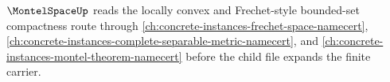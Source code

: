 $\MontelSpaceUp$ reads the locally convex and Frechet-style bounded-set compactness route through \autoref{ch:concrete-instances-frechet-space-namecert}, \autoref{ch:concrete-instances-complete-separable-metric-namecert}, and \autoref{ch:concrete-instances-montel-theorem-namecert} before the child file expands the finite carrier.


